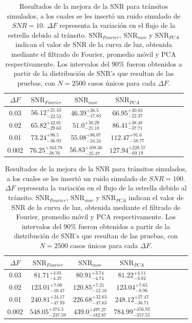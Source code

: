 \begin{table}
	\centering
	\begin{tabular}{ccccccccc}
	\hline 
	$\Delta F$ & $\mbox{SNR}_{Fourier}$ &  $\mbox{SNR}_{mov}$ & $\mbox{SNR}_{PCA}$\\ 
	\hline
	0.03 & 	${56.12}_{-22.53}^{+21.43}$ & ${46.39}_{-17.83}^{+26.5}$ & ${66.95}_{-22.37}^{+20.83}$ \\
	0.02 &  ${65.82}_{-29.63}^{+42.01}$ & ${51.0}_{-21.18}^{+50.29}$ & ${86.41}_{-37.71}^{+38.48}$ \\
	0.01 & ${73.24}_{-36.93}^{+96.5}$ & ${55.08}_{-24.24}^{+86.07}$ & ${112.47}_{-58.77}^{+91.6}$ \\
	0.002 & ${76.25}_{-38.76}^{+163.78}$ & ${56.83}_{-25.37}^{+108.36}$	& ${127.94}_{-69.19}^{+228.57}$ \\
	\hline 
	\end{tabular} 
	\caption{Resultados de la mejora de la SNR para tránsitos simulados, a los cuales se les insertó un ruido simulado de $SNR=10$. $\Delta F$ representa la variación en el flujo de la estrella debido al tránsito. $\mbox{SNR}_{Fourier}$, $\mbox{SNR}_{mov}$ y $\mbox{SNR}_{PCA}$ indican el valor de SNR de la curva de luz, obtenida mediante el filtrado de Fourier, promedio móvil y PCA respectivamente. Los intervalos del 90\% fueron obtenidos a partir de la distribución de SNR's que resultan de las pruebas, con $N=2500$ casos únicos para cada $\Delta F$.}
	\label{tab_mejora_snr_10}
	\end{table}


\begin{table}
	\centering
	\begin{tabular}{ccccccccc}
	\hline 
	$\Delta F$ & $\mbox{SNR}_{Fourier}$ &  $\mbox{SNR}_{mov}$ & $\mbox{SNR}_{PCA}$\\ 
	\hline
	0.03 & 	${81.71}_{-4.37}^{+4.01}$ & ${80.91}_{-4.74}^{+3.74}$ & ${81.22}_{-3.82}^{+4.11}$ \\
	0.02 &  ${123.01}_{-10.47}^{+7.08}$ & ${120.85}_{-12.16}^{+7.21}$ & ${123.04}_{-8.96}^{+7.65}$ \\
	0.01 & ${240.81}_{-47.93}^{+24.17}$ & ${226.68}_{-47.63}^{+32.63}$ & ${248.12}_{-36.71}^{+27.47}$ \\
	0.002 & ${548.05}_{-237.59}^{+474.3}$ & ${439.0}_{-182.87}^{+497.27}$ & ${784.99}_{-357.55}^{+456.92}$ \\
	\hline 
	\end{tabular} 
	\caption{Resultados de la mejora de la SNR para tránsitos simulados, a los cuales se les insertó un ruido simulado de $SNR=100$. $\Delta F$ representa la variación en el flujo de la estrella debido al tránsito. $\mbox{SNR}_{Fourier}$, $\mbox{SNR}_{mov}$ y $\mbox{SNR}_{PCA}$ indican el valor de SNR de la curva de luz, obtenida mediante el filtrado de Fourier, promedio móvil y PCA respectivamente. Los intervalos del 90\% fueron obtenidos a partir de la distribución de SNR's que resultan de las pruebas, con $N=2500$ casos únicos para cada $\Delta F$.}
	\label{tab_mejora_snr_100}
	\end{table}

